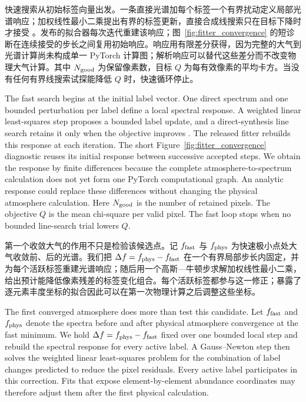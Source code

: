 快速搜索从初始标签向量出发。一条直接光谱加每个标签一个有界扰动定义局部光谱响应；加权线性最小二乘提出有界的标签更新，直接合成线搜索只在目标下降时才接受 \citep{NocedalWright2006}。发布的拟合器每次迭代重建该响应；图~\ref{fig:fitter_convergence} 的短诊断在连续接受的步长之间复用初始响应。响应用有限差分获得，因为完整的大气到光谱计算尚未构成单一 PyTorch 计算图；解析响应可以替代这些差分而不改变物理大气计算。其中 $N_{\rm good}$ 为保留像素数，目标 $Q$ 为每有效像素的平均卡方。当没有任何有界线搜索试探能降低 $Q$ 时，快速循环停止。

\begin{EN}
The fast search begins at the initial label vector. One direct spectrum and one
bounded perturbation per label define a local spectral response. A weighted
linear least-squares step proposes a bounded label update, and a direct-synthesis
line search retains it only when the objective improves
\citep{NocedalWright2006}. The released fitter rebuilds this response at each
iteration. The short Figure~\ref{fig:fitter_convergence} diagnostic reuses its
initial response between successive accepted steps. We obtain the response by
finite differences because the complete atmosphere-to-spectrum calculation
does not yet form one PyTorch computational graph. An analytic response could
replace these differences without changing the physical atmosphere calculation.
Here $N_{\rm good}$ is the number of retained pixels. The objective $Q$ is the
mean chi-square per valid pixel.
The fast loop stops when no bounded line-search trial lowers $Q$.
\end{EN}

第一个收敛大气的作用不只是检验该候选点。记 $f_{\rm fast}$ 与 $f_{\rm phys}$ 为快速极小点处大气收敛前、后的光谱。我们把 $\Delta f=f_{\rm phys}-f_{\rm fast}$ 在一个有界局部步长内固定，并为每个活跃标签重建光谱响应；随后用一个高斯—牛顿步求解加权线性最小二乘，给出预计能降低像素残差的标签变化组合。每个活跃标签都参与这一修正；暴露了逐元素丰度坐标的拟合因此可以在第一次物理计算之后调整这些坐标。

\begin{EN}
The first converged atmosphere does more than test this candidate. Let
$f_{\rm fast}$ and $f_{\rm phys}$ denote the spectra before and after physical
atmosphere convergence at the fast minimum. We hold
$\Delta f=f_{\rm phys}-f_{\rm fast}$ fixed over one bounded local step and
rebuild the spectral response for every active label. A Gauss--Newton step then
solves the weighted linear least-squares problem for the combination of label
changes predicted to reduce the pixel residuals. Every active label participates
in this correction. Fits that expose element-by-element abundance coordinates
may therefore adjust them after the first physical calculation.
\end{EN}

